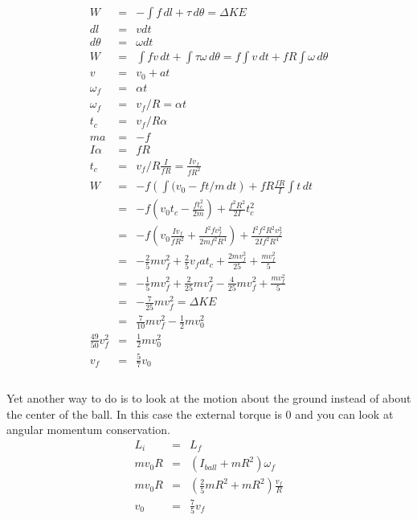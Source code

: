 \documentclass[11pt]{amsart}
\begin{document}
\begin{eqnarray*}
W &=& -\int{f\,dl+\tau\,d\theta} = \Delta{KE} \\
dl &=& vdt \\
d\theta &=& \omega{dt} \\
W &=& \int{fv\,dt}+\int{\tau\omega\,d\theta} = f\int{v\,dt}+fR\int{\omega\,d\theta} \\
v &=& v_{0}+at \\
\omega_{f} &=& \alpha{t} \\
\omega_{f} &=& v_{f}/R = \alpha{t} \\
t_{c} &=& v_{f}/R\alpha \\
ma &=& -f \\
I\alpha &=& fR \\
t_{c} &=& v_{f}/R\frac{I}{fR} = \frac{Iv_{f}}{fR^{2}} \\
W &=& -f(\int{(v_{0}-ft/m\,dt})+fR\frac{fR}{I}\int{t\,dt} \\
&=& -f(v_{0}t_{c} -\frac{ft_{c}^{2}}{2m})+\frac{f^{2}R^{2}}{2I}t_{c}^{2} \\
&=& -f(v_{0}\frac{Iv_{f}}{fR^{2}}+\frac{I^{2}fv_{f}^{2}}{2mf^{2}R^{4}})+\frac{I^{2}f^{2}R^{2}v_{f}^{2}}{2If^{2}R^{4}} \\
&=& -\frac{2}{5}mv_{f}^{2}+\frac{2}{5}v_{f}at_{c}+\frac{2mv_{f}^{2}}{25}+\frac{mv_{f}^{2}}{5} \\
&=& -\frac{1}{5}mv_{f}^{2}+\frac{2}{25}mv_{f}^{2}-\frac{4}{25}mv_{f}^{2}+\frac{mv_{f}^{2}}{5} \\
&=& -\frac{7}{25}mv_{f}^{2} =\Delta{KE} \\
&=& \frac{7}{10}mv_{f}^{2}-\frac{1}{2}mv_{0}^{2} \\
\frac{49}{50}v_{f}^{2} &=& \frac{1}{2}mv_{0}^{2} \\
v_{f} &=& \frac{5}{7}v_{0} \\
\end{eqnarray*} \\
Yet another way to do is to look at the motion about the ground instead of about the center of the ball. In this case the external torque is 0 and you can look at angular momentum conservation. \\
\begin{eqnarray*} 
L_{i} &=& L_{f} \\
mv_{0}R &=& (I_{ball}+mR^{2})\omega_{f} \\
mv_{0}R &=& (\frac{2}{5}mR^{2}+mR^{2})\frac{v_{f}}{R} \\
v_{0} &=& \frac{7}{5}v_{f} 
\end{eqnarray*} \\
\end{document}
